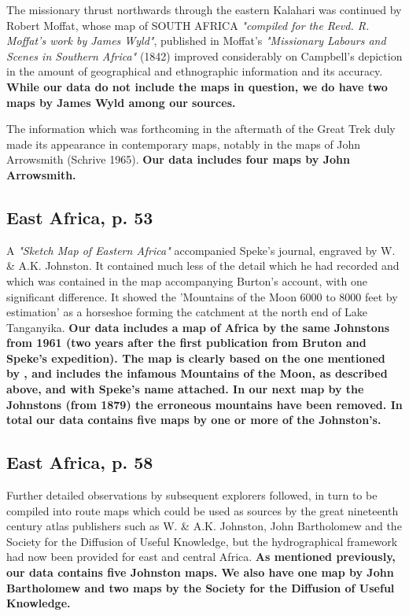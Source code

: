 \documentclass[12pt]{article}
\begin{document}
The missionary thrust northwards through the eastern Kalahari was continued by 
Robert Moffat, whose map of SOUTH AFRICA \textit{"compiled for the Revd. R. 
Moffat's work by James Wyld"}, published in Moffat's \textit{"Missionary Labours
and Scenes in Southern Africa"} (1842) improved considerably on Campbell's 
depiction in the amount of geographical and ethnographic information and its 
accuracy. \textbf{While our data do not include the maps in question, we do have
two maps by James Wyld among our sources.}

The information which was forthcoming in the aftermath of the Great Trek duly
made its appearance in contemporary maps, notably in the maps of John Arrowsmith
(Schrive 1965). \textbf{Our data includes four maps by John Arrowsmith.}

\subsection{East Africa, p. 53}

A \textit{"Sketch Map of Eastern Africa"} accompanied Speke's journal, engraved
by W. \& A.K. Johnston. It contained much less of the detail which he had
recorded and which was contained in the map accompanying Burton's account, with
one significant difference. It showed the 'Mountains of the Moon 6000 to 8000
feet by estimation' as a horseshoe forming the catchment at the north end of
Lake Tanganyika.  \textbf{Our data includes a map of Africa by the same
	Johnstons from 1961 (two years after the first publication from Bruton
	and Speke's expedition). The map is clearly based on the one mentioned
	by \citet{Stone1995}, and includes the infamous Mountains of the Moon,
	as described above, and with Speke's name attached. In our next map by
the Johnstons (from 1879) the erroneous mountains have been removed. In total
our data contains five maps by one or more of the Johnston's.}

\subsection{East Africa, p. 58}

Further detailed observations by subsequent explorers followed, in turn to be
compiled into route maps which could be used as sources by the great nineteenth
century atlas publishers such as W. \& A.K. Johnston, John Bartholomew and the
Society for the Diffusion of Useful Knowledge, but the hydrographical framework
had now been provided for east and central Africa. \textbf{As mentioned
previously, our data contains five Johnston maps. We also have one map by John
Bartholomew and two maps by the Society for the Diffusion of Useful Knowledge.}
\end{document}
